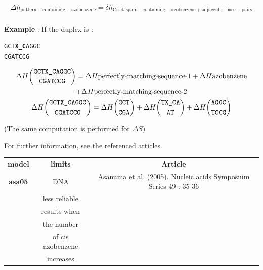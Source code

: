 \documentclass{article}
\begin{document}
\begin{multline*}
  \Delta{}h_\mathrm{pattern-containing-azobenzene} =
  \delta{}h_\mathrm{Crick's pair-containing-azobenzene+adjacent-base-pairs}\\
\end{multline*}

\textbf{Example} :
If the duplex is :
\begin{alltt}
GCT\textbf{X\_C}AGGC
CGATCCG
\end{alltt}
\begin{multline*}
\Delta H {\mbox{\texttt{GCTX\_CAGGC}} \choose \mbox{\texttt{CGATCCG}}} =
\Delta H {\mbox{perfectly-matching-sequence-1}} +
\Delta H {\mbox{azobenzene}} \\ +
\Delta H {\mbox{perfectly-matching-sequence-2}}\\
\Delta H {\mbox{\texttt{GCTX\_CAGGC}} \choose \mbox{\texttt{CGATCCG}}} =
\Delta H {\mbox{\texttt{GCT}} \choose \mbox{\texttt{CGA}}} +
\Delta H {\mbox{\texttt{TX\_CA}} \choose \mbox{\texttt{AT}}} +
\Delta H {\mbox{\texttt{AGGC}} \choose \mbox{\texttt{TCCG}}}\\
\end{multline*}

       (The same computation is performed for $\Delta S$) 
       
For further information, see the referenced articles.

\begin{table}[h]
\begin{tabular}[h]{| c | c | c |}
\textbf{model} & \textbf{limits} & \textbf{Article} \\
\textbf{asa05} & DNA & Asanuma et al. (2005). Nucleic acids Symposium Series 49 : 35-36 \\
 & less reliable & \\
 & results when & \\
 & the number & \\
 & of cis azobenzene & \\
 & increases & \\
\end{tabular}
\end{table}
\end{document}
